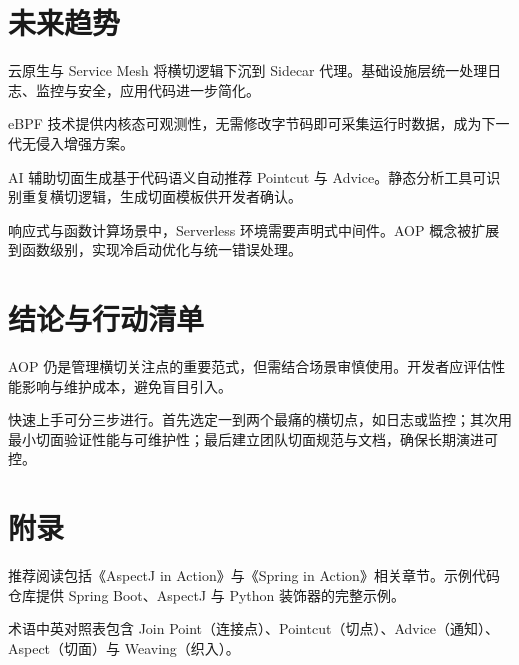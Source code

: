 \chapter{未来趋势}
云原生与 Service Mesh 将横切逻辑下沉到 Sidecar 代理。基础设施层统一处理日志、监控与安全，应用代码进一步简化。\par
eBPF 技术提供内核态可观测性，无需修改字节码即可采集运行时数据，成为下一代无侵入增强方案。\par
AI 辅助切面生成基于代码语义自动推荐 Pointcut 与 Advice。静态分析工具可识别重复横切逻辑，生成切面模板供开发者确认。\par
响应式与函数计算场景中，Serverless 环境需要声明式中间件。AOP 概念被扩展到函数级别，实现冷启动优化与统一错误处理。\par
\chapter{结论与行动清单}
AOP 仍是管理横切关注点的重要范式，但需结合场景审慎使用。开发者应评估性能影响与维护成本，避免盲目引入。\par
快速上手可分三步进行。首先选定一到两个最痛的横切点，如日志或监控；其次用最小切面验证性能与可维护性；最后建立团队切面规范与文档，确保长期演进可控。\par
\chapter{附录}
推荐阅读包括《AspectJ in Action》与《Spring in Action》相关章节。示例代码仓库提供 Spring Boot、AspectJ 与 Python 装饰器的完整示例。\par
术语中英对照表包含 Join Point（连接点）、Pointcut（切点）、Advice（通知）、Aspect（切面）与 Weaving（织入）。\par

